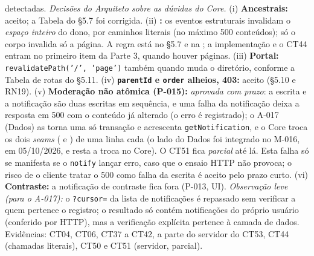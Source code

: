 detectadas. \emph{Decisões do Arquiteto sobre as dúvidas do Core.} (i) \textbf{Ancestrais:} aceito; a Tabela do \S5.7 foi corrigida. (ii) \textbf{:} os eventos estruturais invalidam o \emph{espaço inteiro} do dono, por caminhos literais (no máximo 500 conteúdos); só o corpo invalida só a página. A regra está no \S5.7 e na ; a implementação e o CT44 entram no primeiro item da Parte 3, quando houver páginas. (iii) \textbf{Portal:} \texttt{revalidatePath('/', 'page')} também quando muda o diretório, conforme a Tabela de rotas do \S5.11. (iv) \textbf{\texttt{parentId} e \texttt{order} alheios, 403:} aceito (\S5.10 e RN19). (v) \textbf{Moderação não atômica (P-015):} \emph{aprovada com prazo}: a escrita e a notificação são duas escritas em sequência, e uma falha da notificação deixa a resposta em 500 com o conteúdo já alterado (o erro é registrado); o A-017 (Dados) as torna uma só transação e acrescenta \texttt{getNotification}, e o Core troca os dois \emph{seams} ( e ) de uma linha cada (o lado do Dados foi integrado no M-016, em 05/10/2026, e resta a troca no Core). O CT51 fica \emph{parcial} até lá. Esta falha só se manifesta se o \texttt{notify} lançar erro, caso que o ensaio HTTP não provoca; o risco de o cliente tratar o 500 como falha da escrita é aceito pelo prazo curto. (vi) \textbf{Contraste:} a notificação de contraste fica fora (P-013, UI). \emph{Observação leve (para o A-017):} o \texttt{?cursor=} da lista de notificações é repassado sem verificar a quem pertence o registro; o resultado só contém notificações do próprio usuário (conferido por HTTP), mas a verificação explícita pertence à camada de dados. Evidências: CT04, CT06, CT37 a CT42, a parte do servidor do CT53, CT44 (chamadas literais), CT50 e CT51 (servidor, parcial).

